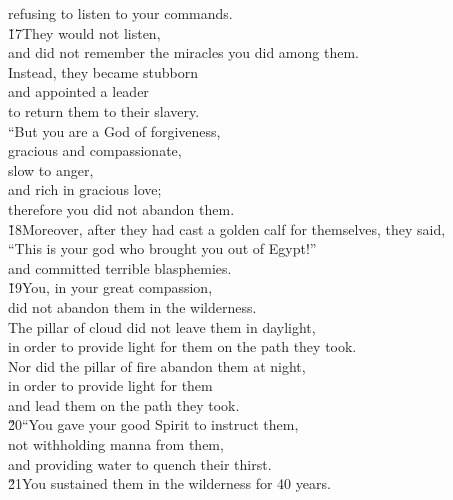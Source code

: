 \begin{poetry}
\poemll    refusing to listen to your commands. \\
\poeml \v{17}They would not listen, \\
\poemll    and did not remember the miracles you did among them. \\
\poeml Instead, they became stubborn \\
\poemll    and appointed a leader \\
\poemlll       to return them to their slavery. \\
\poeml ``But you are a God of forgiveness, \\
\poemll    gracious and compassionate, \\
\poeml slow to anger, \\
\poemll    and rich in gracious love; \\
\poemlll       therefore you did not abandon them. \\
\poeml \v{18}Moreover, after they had cast a golden calf for themselves, they said, \\
\poemll    ``This is your god who brought you out of Egypt!'' \\
\poemlll       and committed terrible blasphemies. \\
\poeml \v{19}You, in your great compassion, \\
\poemll    did not abandon them in the wilderness. \\
\poeml The pillar of cloud did not leave them in daylight, \\
\poemll    in order to provide light for them on the path they took. \\
\poeml Nor did the pillar of fire abandon them at night, \\
\poemll    in order to provide light for them \\
\poemlll       and lead them on the path they took. \\
\poeml \v{20}``You gave your good Spirit to instruct them, \\
\poemll    not withholding manna from them, \\
\poemlll       and providing water to quench their thirst. \\
\poeml \v{21}You sustained them in the wilderness for 40 years. \\

\end{poetry}
